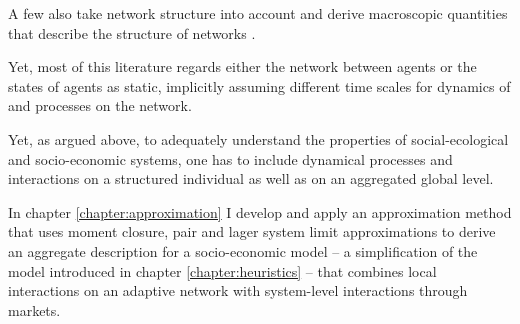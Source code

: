 A few also take network structure into account and derive macroscopic quantities that describe the structure of networks \citep[e.g.][]{Alfarano2008a, Lux2016}.

Yet, most of this literature regards either the network between agents or the states of agents as static, implicitly assuming different time scales for dynamics of and processes on the network.

Yet, as argued above, to adequately understand the properties of social-ecological and socio-economic systems, one has to include dynamical processes and interactions on a structured individual as well as on an aggregated global level.

In chapter \ref{chapter:approximation} I develop and apply an approximation method that uses moment closure, pair and lager system limit approximations to derive an aggregate description for a socio-economic model -- a simplification of the model introduced in chapter \ref{chapter:heuristics} -- that combines local interactions on an adaptive network with system-level interactions through markets. 

